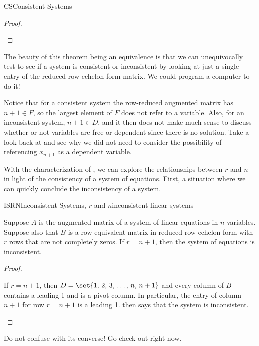 \begin{subsect}{CS}{Consistent Systems}
\begin{proof}
\begin{para}
\end{para}
%
\end{proof}
%
\begin{para}The beauty of this theorem being an equivalence is that we can unequivocally test to see if a system is consistent or inconsistent by looking at just a single entry of the reduced row-echelon form matrix.  We could program a computer to do it!\end{para}
%
%
\begin{para}Notice that for a consistent system the row-reduced augmented matrix has $n+1\in F$, so the largest element of $F$ does not refer to a variable.  Also, for an inconsistent system, $n+1\in D$, and it then does not make much sense to discuss whether or not variables are free or dependent since there is no solution.  Take a look back at  and see why we did not need to consider the possibility of referencing $x_{n+1}$ as a dependent variable.\end{para}
%
\begin{para}With the characterization of , we can explore the relationships between $r$ and $n$ in light of the consistency of a system of equations.  First, a situation where we can quickly conclude the inconsistency of a system.\end{para}
%
\begin{theorem}{ISRN}{Inconsistent Systems, $r$ and $n$}{inconsistent linear systems}
\begin{para}Suppose $A$ is the augmented matrix of a system of linear equations in $n$ variables.  Suppose also that $B$ is a row-equivalent matrix in reduced row-echelon form with $r$ rows that are not completely zeros.  If $r=n+1$, then the system of equations is inconsistent.\end{para}
\end{theorem}
%
\begin{proof}
\begin{para}If  $r=n+1$, then $D=\set{1,\,2,\,3,\,\ldots,\,n,\,n+1}$ and every column of $B$ contains a leading 1 and is a pivot column.  In particular, the entry of column $n+1$ for row $r=n+1$ is a leading 1.   then says that the system is inconsistent.\end{para}
\end{proof}
%
\begin{para}Do not confuse  with its converse!  Go check out  right now.\end{para}


\end{subsect}

